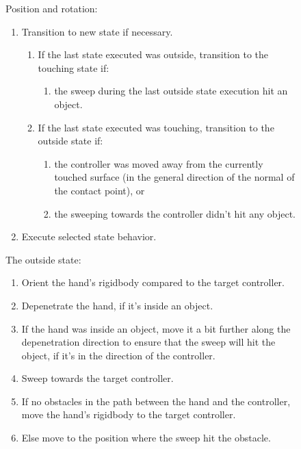 \begin{figure}[H]
\footnotesize
Position and rotation:
\begin{enumerate}
\item Transition to new state if necessary.
\begin{enumerate}[noitemsep,label=\alph*.]
\item If the last state executed was outside, transition to the touching state if:
\begin{enumerate}[noitemsep,label=\arabic*.]
\item the sweep during the last outside state execution hit an object.
\end{enumerate}
\item If the last state executed was touching, transition to the outside state if:
\begin{enumerate}[noitemsep,label=\arabic*.]
\item the controller was moved away from the currently touched surface (in the general direction of the normal of the contact point), or
\item the sweeping towards the controller didn't hit any object.
\end{enumerate}
\end{enumerate}
\item Execute selected state behavior.
\end{enumerate}
\begin{minipage}[t]{0.49\textwidth}
\footnotesize
The outside state:
\begin{enumerate}[noitemsep]
\item Orient the hand's rigidbody compared to the target controller.
\item Depenetrate the hand, if it's inside an object.
\item If the hand was inside an object, move it a bit further along the depenetration direction to ensure that the sweep will hit the object, if it's in the direction of the controller.
\item Sweep towards the target controller.
\item If no obstacles in the path between the hand and the controller, move the hand's rigidbody to the target controller.
\item Else move to the position where the sweep hit the obstacle.
\end{enumerate}
\end{minipage}
\hspace{2em}%

\end{figure}
